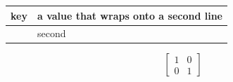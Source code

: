 \documentclass{article}
\begin{document}
\begin{tabular}{|l|p{3cm}|}
\hline
\multirow{2}{*}{key} & a value that wraps onto a second line \\
\hline
 & second \\
\hline
\end{tabular}

\[ \begin{bmatrix} 1 & 0 \\ 0 & 1 \end{bmatrix} \]
\end{document}

